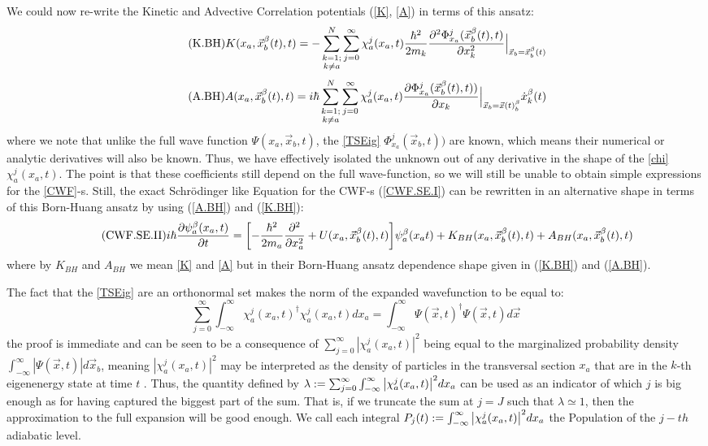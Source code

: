 \documentclass[11pt, a4paper]{article} %
\begin{document}
We could now re-write the Kinetic and Advective Correlation potentials (\ref{K}, \ref{A}) in terms of this ansatz:
\begin{equation}\label{K.BH}\tag{K.BH}
K(x_a, \vec{x}_b^\beta(t), t) = -  \sum_{\substack{k=1; \\ k\neq a}}^{N} \sum_{j=0}^\infty \chi_a^j(x_a,t) \frac{\hbar^2}{2m_k} \pdv[2]{ \Phi_{x_a}^j(\vec{x}_b^\beta(t),t)}{x_k}\Big\rvert_{\vec{x}_b=\vec{x}_b^\beta(t)}
\end{equation}
\begin{equation}\label{A.BH}\tag{A.BH}
A(x_a, \vec{x}_b^\beta(t), t) =  i \hbar \sum_{\substack{k=1; \\ k\neq a}}^{N} \sum_{j=0}^\infty \chi_a^j(x_a,t) \pdv{ \Phi_{x_a}^j(\vec{x}_b^\beta(t),t))}{x_k}\Big\rvert_{\vec{x}_b=\vec{x}(t)_b^\beta} \dot{x}_k^\beta(t)
\end{equation}
where we note that unlike the full wave function $\Psi(x_a, \vec{x}_b,t)$, the \ref{TSEig} $\Phi_{x_a}^j(\vec{x}_b,t))$ are known, which means their numerical or analytic derivatives will also be known. Thus, we have effectively isolated the unknown out of any derivative in the shape of the \ref{chi} $\chi^j_a(x_a,t)$. The point is that these coefficients still depend on the full wave-function, so we will still be unable to obtain simple expressions for the \ref{CWF}-s. Still, the exact Schrödinger like Equation for the CWF-s (\ref{CWF.SE.I}) can be rewritten in an alternative shape in terms of this Born-Huang ansatz by using (\ref{A.BH}) and (\ref{K.BH}):
\begin{equation}\label{CWF.SE.II}\tag{CWF.SE.II}
i\hbar \pdv{\psi_a^\beta(x_a, t)}{t} = \qty[- \frac{\hbar^2}{2m_a}\pdv[2]{}{x_a} + U(x_a, \vec{x}_b^\beta(t), t)]\psi_a^\beta(x_a t) + K_{BH}(x_a, \vec{x}_b^\beta(t), t) +A_{BH}(x_a, \vec{x}_b^\beta(t), t) 
\end{equation}
where by $ K_{BH}$ and $ A_{BH}$ we mean \ref{K} and \ref{A} but in their Born-Huang ansatz dependence shape given in (\ref{K.BH}) and (\ref{A.BH}).

The fact that the \ref{TSEig} are an orthonormal set makes the norm of the expanded wavefunction to be equal to:
$$
\sum_{j=0}^\infty \int_{-\infty}^\infty \chi_a^j(x_a,t)^\dagger \chi_a^j(x_a,t) dx_a = \int_{-\infty}^\infty \Psi(\vec{x},t)^\dagger \Psi(\vec{x},t)d\vec{x}
$$
the proof is immediate and can be seen to be a consequence of $\sum_{j=0}^\infty|\chi^j_a(x_a,t)|^2$ being equal to the marginalized probability density $\int_{-\infty}^\infty |\Psi(\vec{x},t)|d\vec{x}_b$, meaning $|\chi^j_a(x_a,t)|^2$ may be interpreted as the density of particles in the transversal section $x_a$ that are in the $k$-th eigenenergy state at time $t$ . Thus, the quantity defined by $\lambda:=\sum_{j=0}^\infty \int_{-\infty}^\infty \qty|\chi_a^j(x_a,t)|^2 dx_a$ can be used as an indicator of which $j$ is big enough as for having captured the biggest part of the sum. That is, if we truncate the sum at $j=J$ such that $\lambda\simeq 1$, then the approximation to the full expansion will be good enough. We call each integral $P_j(t):=\int_{-\infty}^\infty \qty|\chi_a^j(x_a,t)|^2 dx_a$ the Population of the $j-th$ adiabatic level.
\newpage
\end{document}
